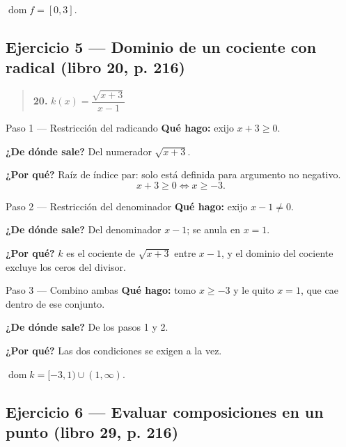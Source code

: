 \documentclass[11pt]{article}
\begin{document}
\begin{resp}
$\operatorname{dom} f=[0,3]$.
\end{resp}

\subsection*{Ejercicio 5 — Dominio de un cociente con radical (libro 20, p. 216)}

\begin{quote}
\textbf{20.} $k(x)=\dfrac{\sqrt{x+3}}{x-1}$
\end{quote}

\begin{paso}{Paso 1 --- Restricción del radicando}
\textbf{Qué hago:} exijo $x+3\ge 0$.

\textbf{¿De dónde sale?} Del numerador $\sqrt{x+3}$.

\textbf{¿Por qué?} Raíz de índice par: solo está definida para argumento no negativo.
\[
x+3\ge 0 \iff x\ge -3 .
\]
\end{paso}

\begin{paso}{Paso 2 --- Restricción del denominador}
\textbf{Qué hago:} exijo $x-1\neq 0$.

\textbf{¿De dónde sale?} Del denominador $x-1$; se anula en $x=1$.

\textbf{¿Por qué?} $k$ es el cociente de $\sqrt{x+3}$ entre $x-1$, y el dominio del cociente excluye los ceros del divisor.
\end{paso}

\begin{paso}{Paso 3 --- Combino ambas}
\textbf{Qué hago:} tomo $x\ge -3$ y le quito $x=1$, que cae dentro de ese conjunto.

\textbf{¿De dónde sale?} De los pasos 1 y 2.

\textbf{¿Por qué?} Las dos condiciones se exigen a la vez.
\end{paso}

\begin{resp}
$\operatorname{dom} k=[-3,1)\cup(1,\infty)$.
\end{resp}

\subsection*{Ejercicio 6 — Evaluar composiciones en un punto (libro 29, p. 216)}
\end{document}
